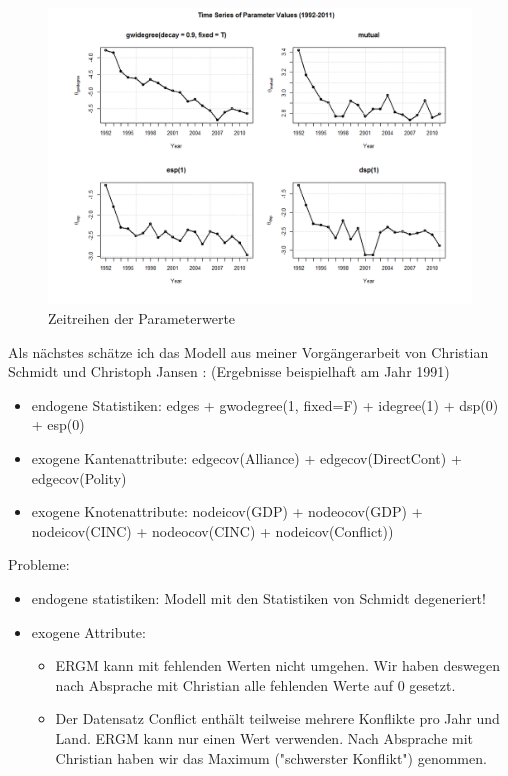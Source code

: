 \documentclass[a4paper,ngerman,oneside,titlepage,bibliography=totoc,11pt]{scrreprt}
\begin{document}
\begin{figure}[h]
	\centering
		\includegraphics[width=1.00\textwidth]{Grafiken/ts_ERGM_coef.png}
	\caption{Zeitreihen der Parameterwerte}
	\label{fig:ts_ERGM_coef}
\end{figure}

Als nächstes schätze ich das Modell aus meiner Vorgängerarbeit von Christian Schmidt und Christoph Jansen \cite{js14}: (Ergebnisse beispielhaft am Jahr 1991)
\begin{itemize}
  \item endogene Statistiken: edges + gwodegree(1, fixed=F) + idegree(1) + dsp(0) + esp(0)
	\item exogene Kantenattribute: edgecov(Alliance) + edgecov(DirectCont)  + edgecov(Polity)
  \item exogene Knotenattribute: nodeicov(GDP) + nodeocov(GDP) + nodeicov(CINC) + nodeocov(CINC) + nodeicov(Conflict))
\end{itemize}

Probleme:
\begin{itemize}
\item endogene statistiken: Modell mit den Statistiken von Schmidt degeneriert!
\item exogene Attribute: 
  \begin{itemize} 
  \item ERGM kann mit fehlenden Werten nicht umgehen. Wir haben deswegen nach Absprache mit Christian alle fehlenden Werte auf 0 gesetzt.
  \item Der Datensatz Conflict enthält teilweise mehrere Konflikte pro Jahr und Land. ERGM kann nur einen Wert verwenden. Nach Absprache mit Christian haben wir das Maximum ("schwerster Konflikt") genommen.
  \end{itemize}
\end{itemize}
\end{document}
